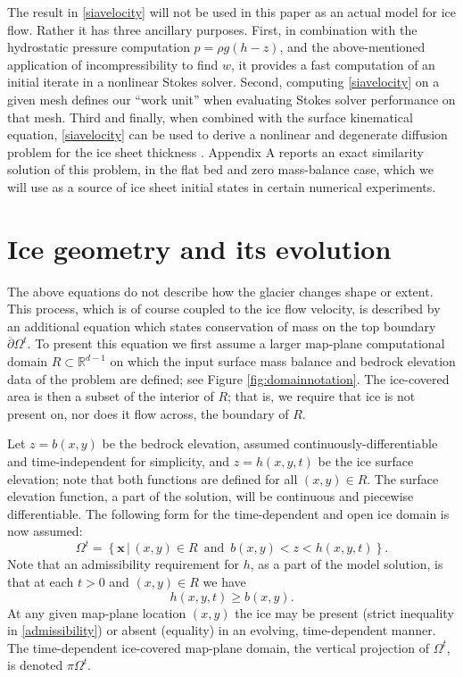 \documentclass[letterpaper,final,12pt,reqno]{amsart}
\newcommand{\RR}{\mathbb{R}}
\newcommand{\bx}{\mathbf{x}}
\begin{document}
The result in \eqref{siavelocity} will not be used in this paper as an actual model for ice flow.  Rather it has three ancillary purposes.  First, in combination with the hydrostatic pressure computation $p=\rho g (h-z)$, and the above-mentioned application of incompressibility to find $w$, it provides a fast computation of an initial iterate in a nonlinear Stokes solver.  Second, computing \eqref{siavelocity} on a given mesh defines our ``work unit'' when evaluating Stokes solver performance on that mesh.  Third and finally, when combined with the surface kinematical equation, \eqref{siavelocity} can be used to derive a nonlinear and degenerate diffusion problem for the ice sheet thickness \cite{Fowler1997}.  Appendix A reports an exact similarity solution of this problem, in the flat bed and zero mass-balance case, which we will use as a source of ice sheet initial states in certain numerical experiments.


\section{Ice geometry and its evolution} \label{sec:stronggeometry}

The above equations do not describe how the glacier changes shape or extent.  This process, which is of course coupled to the ice flow velocity, is described by an additional equation which states conservation of mass on the top boundary $\overline{\partial} \Omega^t$.  To present this equation we first assume a larger map-plane computational domain $R\subset \RR^{d-1}$ on which the input surface mass balance and bedrock elevation data of the problem are defined; see Figure \ref{fig:domainnotation}.  The ice-covered area is then a subset of the interior of $R$; that is, we require that ice is not present on, nor does it flow across, the boundary of $R$.

Let $z=b(x,y)$ be the bedrock elevation, assumed continuously-differentiable and time-independent for simplicity, and $z=h(x,y,t)$ be the ice surface elevation; note that both functions are defined for all $(x,y)\in R$.  The surface elevation function, a part of the solution, will be continuous and piecewise differentiable.  The following form for the time-dependent and open ice domain is now assumed:
\begin{equation}
\Omega^t = \left\{\bx\,\big|\,(x,y)\in R \,\text{ and }\, b(x,y) < z < h(x,y,t)\right\}.  \label{Omegat}
\end{equation}
Note that an admissibility requirement \cite{Bueler2016} for $h$, as a part of the model solution, is that at each $t>0$ and $(x,y)\in R$ we have
\begin{equation}
h(x,y,t) \ge b(x,y).  \label{admissibility}
\end{equation}
At any given map-plane location $(x,y)$ the ice may be present (strict inequality in \eqref{admissibility}) or absent (equality) in an evolving, time-dependent manner.  The time-dependent ice-covered map-plane domain, the vertical projection of $\Omega^t$, is denoted $\pi \Omega^t$.
\end{document}
